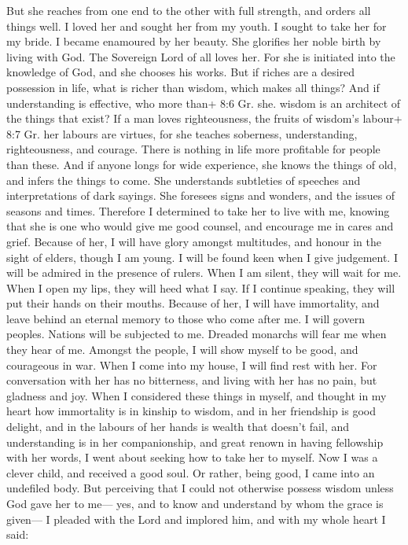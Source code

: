  But she reaches from one end to the other with full
strength, and orders all things well.  I loved her and
sought her from my youth. I sought to take her for my bride. I became
enamoured by her beauty.  She glorifies her noble birth by
living with God. The Sovereign Lord of all loves her.  For
she is initiated into the knowledge of God, and she chooses his works.
 But if riches are a desired possession in life, what is
richer than wisdom, which makes all things?  And if
understanding is effective, who more than+ 8:6 Gr. she. wisdom is an
architect of the things that exist?  If a man loves
righteousness, the fruits of wisdom's labour+ 8:7 Gr. her labours are
virtues, for she teaches soberness, understanding, righteousness, and
courage. There is nothing in life more profitable for people than these.
 And if anyone longs for wide experience, she knows the
things of old, and infers the things to come. She understands subtleties
of speeches and interpretations of dark sayings. She foresees signs and
wonders, and the issues of seasons and times.  Therefore I
determined to take her to live with me, knowing that she is one who
would give me good counsel, and encourage me in cares and grief.
 Because of her, I will have glory amongst multitudes, and
honour in the sight of elders, though I am young.  I will
be found keen when I give judgement. I will be admired in the presence
of rulers.  When I am silent, they will wait for me. When I
open my lips, they will heed what I say. If I continue speaking, they
will put their hands on their mouths.  Because of her, I
will have immortality, and leave behind an eternal memory to those who
come after me.  I will govern peoples. Nations will be
subjected to me.  Dreaded monarchs will fear me when they
hear of me. Amongst the people, I will show myself to be good, and
courageous in war.  When I come into my house, I will find
rest with her. For conversation with her has no bitterness, and living
with her has no pain, but gladness and joy.  When I
considered these things in myself, and thought in my heart how
immortality is in kinship to wisdom,  and in her friendship
is good delight, and in the labours of her hands is wealth that doesn't
fail, and understanding is in her companionship, and great renown in
having fellowship with her words, I went about seeking how to take her
to myself.  Now I was a clever child, and received a good
soul.  Or rather, being good, I came into an undefiled
body.  But perceiving that I could not otherwise possess
wisdom unless God gave her to me--- yes, and to know and understand by
whom the grace is given--- I pleaded with the Lord and implored him, and
with my whole heart I said:


